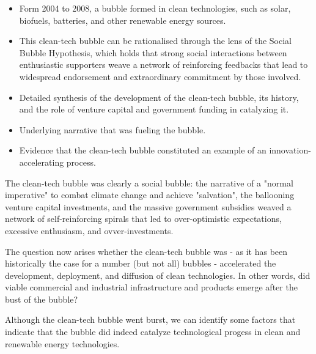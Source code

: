 \begin{itemize}
    \item Form 2004 to 2008, a bubble formed in clean technologies, such as
        solar, biofuels, batteries, and other renewable energy sources.
    \item This clean-tech bubble can be rationalised through the lens of the
        Social Bubble Hypothesis, which holds that strong social interactions
        between enthusiastic supporters weave a network of reinforcing feedbacks
        that lead to widespread endorsement and extraordinary commitment by
        those involved.
    \item Detailed synthesis of the development of the clean-tech bubble, its
        history, and the role of venture capital and government funding in
        catalyzing it.
    \item Underlying narrative that was fueling the bubble.
    \item Evidence that the clean-tech bubble constituted an example of an
        innovation-accelerating process.
\end{itemize}

The clean-tech bubble was clearly a social bubble: the narrative of a "normal
imperative" to combat climate change and achieve "salvation", the ballooning
venture capital investments, and the massive government subsidies weaved a
network of self-reinforcing spirals that led to over-optimistic expectations,
excessive enthusiasm, and ovver-investments.

\vspace{1\baselineskip}

The question now arises whether the clean-tech bubble was - as it has been
historically the case for a number (but not all) bubbles - accelerated the
development, deployment, and diffusion of clean technologies. In other words,
did viable commercial and industrial infrastructure and products emerge after
the bust of the bubble?

\vspace{1\baselineskip}

Although the clean-tech bubble went burst, we can identify some factors that
indicate that the bubble did indeed catalyze technological progess in clean
and renewable energy technologies.

\vspace{1\baselineskip}

